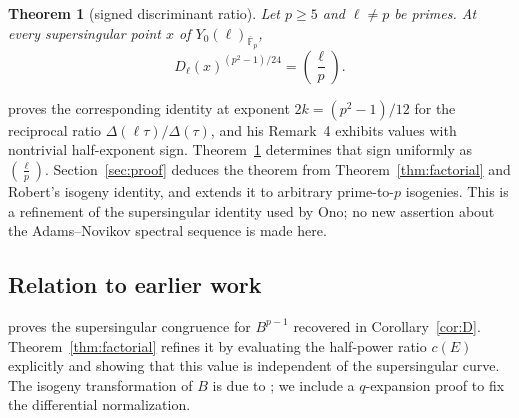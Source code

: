 \documentclass[11pt,a4paper]{article}
\numberwithin{equation}{section}
\newtheorem{theorem}{Theorem}[section]
\theoremstyle{definition}
\theoremstyle{remark}
\newcommand{\Fb}{\overline{\mathbb F}_p}
\newcommand{\leg}[2]{\left(\frac{#1}{#2}\right)}
\begin{document}
\begin{samepage}
\begin{theorem}[signed discriminant ratio]\label{thm:C}
Let $p\ge5$ and $\ell\ne p$ be primes. At every supersingular point
$x$ of $Y_0(\ell)_{\Fb}$,
\[
D_\ell(x)^{(p^2-1)/24}=\leg{\ell}{p}.
\]
\end{theorem}
\end{samepage}



\citet[Theorem~1.2]{Ono25} proves the corresponding identity at exponent
$2k=(p^2-1)/12$ for the reciprocal ratio
$\Delta(\ell\tau)/\Delta(\tau)$, and his Remark~4 exhibits values
with nontrivial half-exponent sign. Theorem~\ref{thm:C} determines
that sign uniformly as $\left(\frac{\ell}{p}\right)$.
Section~\ref{sec:proof} deduces the theorem from
Theorem~\ref{thm:factorial} and Robert's isogeny identity, and extends
it to arbitrary prime-to-$p$ isogenies. This is a refinement of the
supersingular identity used by Ono; no new assertion about the
Adams--Novikov spectral sequence is made here.

\subsection{Relation to earlier work}
\citet{Baker98} proves the supersingular congruence for $B^{p-1}$
recovered in Corollary~\ref{cor:D}. Theorem~\ref{thm:factorial}
refines it by evaluating the half-power ratio $c(E)$ explicitly and
showing that this value is independent of the supersingular curve.
The isogeny transformation of $B$ is due to
\citet[Th\'eor\`eme B, p.~106; \S3.3, Lemma~7 and (19), p.~124]{Robert80};
we include a $q$-expansion proof to fix the differential normalization.
\end{document}
